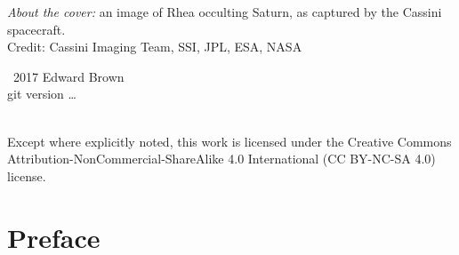 
\maketitle
\newpage
\begin{fullwidth}
\thispagestyle{empty}

\vspace{3\baselineskip}
\noindent \emph{About the cover:} an image of Rhea occulting Saturn, as captured by the Cassini spacecraft.\\
\noindent Credit: Cassini Imaging Team, SSI, JPL, ESA, NASA

\vfill
\noindent \ccCopy\ 2017 Edward Brown\\
\noindent git version \ldots

\vspace{3\baselineskip}
\noindent \ccbyncsa \\
\noindent Except where explicitly noted, this work is licensed under the Creative Commons
Attribution-NonCommercial-ShareAlike 4.0 International (CC BY-NC-SA
4.0) license.

\end{fullwidth}
\newpage
\chapter*{Preface}


\tableofcontents
\listoffigures
\listoftables
\listofsidebars
\listofexercises
